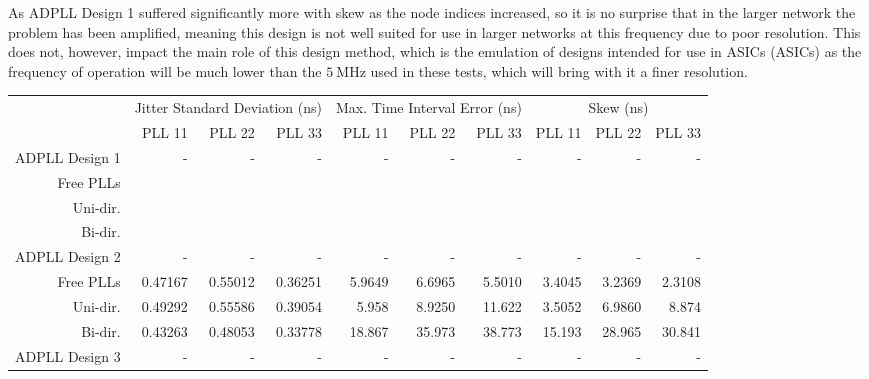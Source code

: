 As \ac{ADPLL} Design 1 suffered significantly more with skew as the node indices increased, so it is no surprise that in the larger network the problem has been amplified, meaning this design is not well suited for use in larger networks at this frequency due to poor resolution. This does not, however, impact the main role of this design method, which is the emulation of designs intended for use in \aclp{ASIC} (\acsp{ASIC}) as the frequency of operation will be much lower than the $5~\si{\mega\hertz}$ used in these tests, which will bring with it a finer resolution.
\begin{table}[!ht]
    \begin{center}
        \begin{footnotesize}
            \setlength{\tabcolsep}{.9\tabcolsep}
            \begin{tabular}{ll|r|r|r|r|r|r|r|r|r|}           
                \cline{3-11}
                && \multicolumn{3}{c|}{Jitter Standard Deviation (ns)} & \multicolumn{3}{c|}{Max. Time Interval Error (ns)} & \multicolumn{3}{c|}{Skew (ns)} \T\\
                \cline{3-11} 
                &&PLL 11&PLL 22&PLL 33    &PLL 11&PLL 22&PLL 33    &PLL 11&PLL 22&PLL 33 \T\\
                \hline
                \multicolumn{2}{|l|}{\ac{ADPLL} Design 1}&-&-&-&-&-&-&-&-&-\T\\
                \multicolumn{2}{|r|}{Free PLLs} &&& &&& &&& \T\\
                \multicolumn{2}{|r|}{Uni-dir.}  &&& &&& &&& \T\\
                \multicolumn{2}{|r|}{Bi-dir.}   &&& &&& &&& \T\\
                \hline
                \multicolumn{2}{|l|}{\ac{ADPLL} Design 2}&-&-&-&-&-&-&-&-&-\T\\
                \multicolumn{2}{|r|}{Free PLLs} &0.47167 &0.55012 &0.36251    &5.9649 &6.6965 &5.5010    &3.4045&3.2369&2.3108 \T\\
                \multicolumn{2}{|r|}{Uni-dir.}  &0.49292 &0.55586 &0.39054    &5.958  &8.9250 &11.622    &3.5052&6.9860&8.874 \T\\
                \multicolumn{2}{|r|}{Bi-dir.}   &0.43263 &0.48053 &0.33778    &18.867 &35.973 &38.773    &15.193&28.965&30.841 \T\\
                \hline
                \multicolumn{2}{|l|}{\ac{ADPLL} Design 3}&-&-&-&-&-&-&-&-&-\T\\

\end{tabular}
\end{footnotesize}
\end{center}
\end{table}
